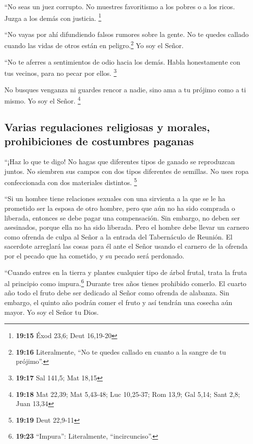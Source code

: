  ``No seas un juez corrupto. No muestres favoritismo a
los pobres o a los ricos. Juzga a los demás con justicia. \footnote{\textbf{19:15}
  Éxod 23,6; Deut 16,19-20}

 ``No vayas por ahí difundiendo falsos rumores sobre la
gente. No te quedes callado cuando las vidas de otros están en
peligro.\footnote{\textbf{19:16} Literalmente, ``No te quedes callado en
  cuanto a la sangre de tu prójimo''.} Yo soy el Señor.

 ``No te aferres a sentimientos de odio hacia los demás.
Habla honestamente con tus vecinos, para no pecar por ellos. \footnote{\textbf{19:17}
  Sal 141,5; Mat 18,15}

 No busques venganza ni guardes rencor a nadie, sino ama
a tu prójimo como a ti mismo. Yo soy el Señor. \footnote{\textbf{19:18}
  Mat 22,39; Mat 5,43-48; Luc 10,25-37; Rom 13,9; Gal 5,14; Sant 2,8;
  Juan 13,34}

\hypertarget{varias-regulaciones-religiosas-y-morales-prohibiciones-de-costumbres-paganas}{%
\subsection{Varias regulaciones religiosas y morales, prohibiciones de
costumbres
paganas}\label{varias-regulaciones-religiosas-y-morales-prohibiciones-de-costumbres-paganas}}

 ``¡Haz lo que te digo! No hagas que diferentes tipos de
ganado se reproduzcan juntos. No siembren sus campos con dos tipos
diferentes de semillas. No uses ropa confeccionada con dos materiales
distintos. \footnote{\textbf{19:19} Deut 22,9-11}

 ``Si un hombre tiene relaciones sexuales con una
sirvienta a la que se le ha prometido ser la esposa de otro hombre, pero
que aún no ha sido comprada o liberada, entonces se debe pagar una
compensación. Sin embargo, no deben ser asesinados, porque ella no ha
sido liberada.  Pero el hombre debe llevar un carnero
como ofrenda de culpa al Señor a la entrada del Tabernáculo de Reunión.
 El sacerdote arreglará las cosas para él ante el Señor
usando el carnero de la ofrenda por el pecado que ha cometido, y su
pecado será perdonado.

 ``Cuando entres en la tierra y plantes cualquier tipo de
árbol frutal, trata la fruta al principio como impura.\footnote{\textbf{19:23}
  ``Impura'': Literalmente, ``incircunciso''.} Durante tres años tienes
prohibido comerlo.  El cuarto año todo el fruto debe ser
dedicado al Señor como ofrenda de alabanza.  Sin embargo,
el quinto año podrán comer el fruto y así tendrán una cosecha aún mayor.
Yo soy el Señor tu Dios.

